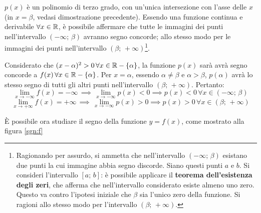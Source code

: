 $p(x)$ è un polinomio di terzo grado, con un'unica intersezione con l'asse delle $x$ (in $x=\beta$, vedasi dimostrazione precedente). Essendo una funzione continua e derivabile $\forall x\in\mathbb{R}$, è possibile affermare che tutte le immagini dei punti nell'intervallo $(-\infty; \,\beta)$ avranno segno concorde; allo stesso modo per le immagini dei punti nell'intervallo $(\beta; \,+\infty)$\footnote{Ragionando per assurdo, si ammetta che nell'intervallo $(-\infty; \,\beta)$ esistano due punti la cui immagine abbia segno discorde. Siano questi punti $a$ e $b$. Si consideri l'intervallo $[a;\,b]$: è possibile applicare il \textbf{teorema dell'esistenza degli zeri}, che afferma che nell'intervallo considerato esiste almeno uno zero. Questo va contro l'ipotesi iniziale che $\beta$ sia l'unico zero della funzione. Si ragioni allo stesso modo per l'intervallo $(\beta; \,+\infty)$.}.

Considerato che $(x-\alpha)^2>0\,\forall x\in \mathbb{R}-\{\alpha\}$, la funzione $p(x)$ sarà avrà segno concorde a $f(x)\,\forall x\in \mathbb{R}-\{\alpha\}$. Per $x=\alpha$, essendo $\alpha\neq\beta$ e $\alpha>\beta$, $p(\alpha)$ avrà lo stesso segno di tutti gli altri punti nell'intervallo $(\beta; \,+\infty)$. Pertanto:
\[
\lim_{x\to-\infty}f(x)=-\infty\,\implies\,\lim_{x\to-\infty}p(x)<0\implies p(x)<0\,\forall x\in (-\infty;\,\beta)
\]
\[
\lim_{x\to+\infty}f(x)=+\infty\,\implies\,\lim_{x\to-\infty}p(x)>0\implies p(x)>0\,\forall x\in(\beta; \,+\infty)
\]

È possibile ora {studiare il segno} della funzione $y=f(x)$, come mostrato alla figura \ref{sgn:f}
\begin{figure}
\end{figure}

